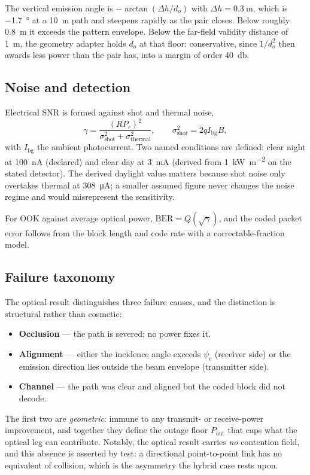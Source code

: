 \documentclass[conference]{IEEEtran}
\begin{document}
The vertical emission angle is $-\arctan(\Delta h/d_o)$ with
$\Delta h=\SI{0.3}{\meter}$, which is \SI{-1.7}{\degree} at a
\SI{10}{\meter} path and steepens rapidly as the pair closes. Below roughly
\SI{0.8}{\meter} it exceeds the pattern envelope. Below the far-field validity
distance of \SI{1}{\meter}, the geometry adapter holds $d_o$ at that floor:
conservative, since $1/d_o^{2}$ then awards less power than the pair has, into
a margin of order \SI{40}{\decibel}.

\subsection{Noise and detection}

Electrical SNR is formed against shot and thermal noise,
\begin{equation}
\gamma = \frac{(R P_r)^{2}}{\sigma^{2}_{\mathrm{shot}}
+ \sigma^{2}_{\mathrm{thermal}}},
\qquad
\sigma^{2}_{\mathrm{shot}} = 2qI_{\mathrm{bg}}B,
\end{equation}
with $I_{\mathrm{bg}}$ the ambient photocurrent. Two named conditions are
defined: clear night at \SI{100}{\nano\ampere} (declared) and clear day at
\SI{3}{\milli\ampere} (derived from \SI{1}{\kilo\watt\per\meter\squared} on
the stated detector). The derived daylight value matters because shot noise
only overtakes thermal at \SI{308}{\micro\ampere}; a smaller assumed figure
never changes the noise regime and would misrepresent the sensitivity.

For OOK against average optical power, $\mathrm{BER}=Q(\sqrt{\gamma})$, and
the coded packet error follows from the block length and code rate with a
correctable-fraction model.

\subsection{Failure taxonomy}

The optical result distinguishes three failure causes, and the distinction is
structural rather than cosmetic:
\begin{itemize}
\item \textbf{Occlusion} --- the path is severed; no power fixes it.
\item \textbf{Alignment} --- either the incidence angle exceeds $\psi_c$
(receiver side) or the emission direction lies outside the beam envelope
(transmitter side).
\item \textbf{Channel} --- the path was clear and aligned but the coded block
did not decode.
\end{itemize}
The first two are \emph{geometric}: immune to any transmit- or receive-power
improvement, and together they define the outage floor $P_{\mathrm{out}}$ that
caps what the optical leg can contribute. Notably, the optical result carries
\emph{no} contention field, and this absence is asserted by test: a
directional point-to-point link has no equivalent of collision, which is the
asymmetry the hybrid case rests upon.
\end{document}
